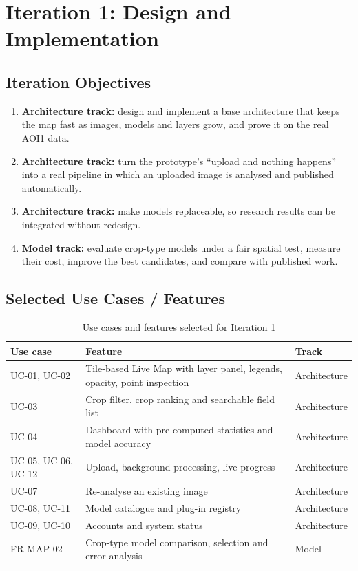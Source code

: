 \chapter{Iteration 1: Design and Implementation}\label{ch:iter1}

\section{Iteration Objectives}
\begin{enumerate}
  \item \textbf{Architecture track:} design and implement a base architecture that keeps the map
        fast as images, models and layers grow, and prove it on the real AOI1 data.
  \item \textbf{Architecture track:} turn the prototype's ``upload and nothing happens'' into a real
        pipeline in which an uploaded image is analysed and published automatically.
  \item \textbf{Architecture track:} make models replaceable, so research results can be integrated
        without redesign.
  \item \textbf{Model track:} evaluate crop-type models under a fair spatial test, measure their cost,
        improve the best candidates, and compare with published work.
\end{enumerate}

\section{Selected Use Cases / Features}
\begin{table}[htbp]
\centering\small
\caption{Use cases and features selected for Iteration 1}
\label{tab:it1features}
\begin{tabularx}{\textwidth}{L{1.4cm} Y L{2.2cm}}
\toprule
\textbf{Use case} & \textbf{Feature} & \textbf{Track}\\
\midrule
UC-01, UC-02 & Tile-based Live Map with layer panel, legends, opacity, point inspection & Architecture\\
UC-03 & Crop filter, crop ranking and searchable field list & Architecture\\
UC-04 & Dashboard with pre-computed statistics and model accuracy & Architecture\\
UC-05, UC-06, UC-12 & Upload, background processing, live progress & Architecture\\
UC-07 & Re-analyse an existing image & Architecture\\
UC-08, UC-11 & Model catalogue and plug-in registry & Architecture\\
UC-09, UC-10 & Accounts and system status & Architecture\\
FR-MAP-02 & Crop-type model comparison, selection and error analysis & Model\\
\bottomrule
\end{tabularx}
\end{table}

